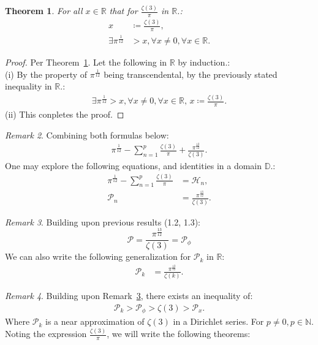 \documentclass[10pt]{article}
\theoremstyle{plain}
\newtheorem{theorem}{Theorem}[section]
\theoremstyle{definition}
\theoremstyle{remark}
\newtheorem{remark}[theorem]{Remark}
\begin{document}
\begin{theorem}
\label{theo:first-zeta}
For all $x \in \mathbb{R}$ that for $\frac{\zeta(3)}{\pi}$ in $\mathbb{R}$.:
\begin{align*}
	x &\coloneq \frac{\zeta(3)}{\pi},\\
	\exists \pi^{\frac{1}{12}} &> x, \forall x \neq 0, \forall x \in \mathbb{R}.
\end{align*}
\end{theorem}
\begin{proof}
Per Theorem~\ref{theo:first-zeta}. Let the following in $\mathbb{R}$ by induction.:\\(i) By the property of $\pi^{\frac{1}{12}}$ being transcendental, by the previously stated inequality in $\mathbb{R}.$:
\begin{align*}
		\exists \pi^{\frac{1}{12}} > x, \forall x \neq 0, \forall x \in \mathbb{R}, \, x \coloneq \frac{\zeta(3)}{\pi}.
\end{align*}
(ii) This conpletes the proof.
\end{proof}
\begin{remark}
	\label{remark:sum-both}
	Combining both formulas below:
	\begin{align*}
		\pi^{\frac{1}{12}} - \sum_{n=1}^{p}\frac{\zeta(3)}{\pi} + \frac{\pi^{\frac{13}{12}}}{\zeta(3)}.
	\end{align*}
	One may explore the following equations, and identities in a domain $\mathbb{D}.$:
	\begin{align*}
		\pi^{\frac{1}{12}} - \sum_{n=1}^{p}\frac{\zeta(3)}{\pi} &= \mathcal{H}_n,\\
		\mathcal{P}_n &= \frac{\pi^{\frac{13}{12}}}{\zeta(3)}.
	\end{align*}
\end{remark}
\begin{remark}
\label{remark:frac-zeta}
	Building upon previous results (1.2, 1.3):
	\begin{equation}
		\mathcal{P} = \frac{\pi^{\frac{13}{12}}}{\zeta(3)} = \mathcal{P}_\phi
	\end{equation}
	We can also write the following generalization for $\mathcal{P}_k$ in $\mathbb{R}$:
	\begin{align*}
		\mathcal{P}_k &= \frac{\pi^{\frac{13}{12}}}{\zeta(k)}.
	\end{align*}
\end{remark}
\begin{remark}
	Building upon Remark~\ref{remark:frac-zeta}, there exists an inequality of:
	\begin{align*}
		\mathcal{P}_k > \mathcal{P}_\phi > \zeta(3) > \mathcal{P}_x. 
	\end{align*}
	Where $\mathcal{P}_k$ is a near approximation of $\zeta(3)$ in a Dirichlet series.  For $p \neq 0, p \in \mathbb{N}$. Noting the expression $\frac{\zeta(3)}{\pi}$, we will write the following theorems:
\end{remark}
\end{document}
